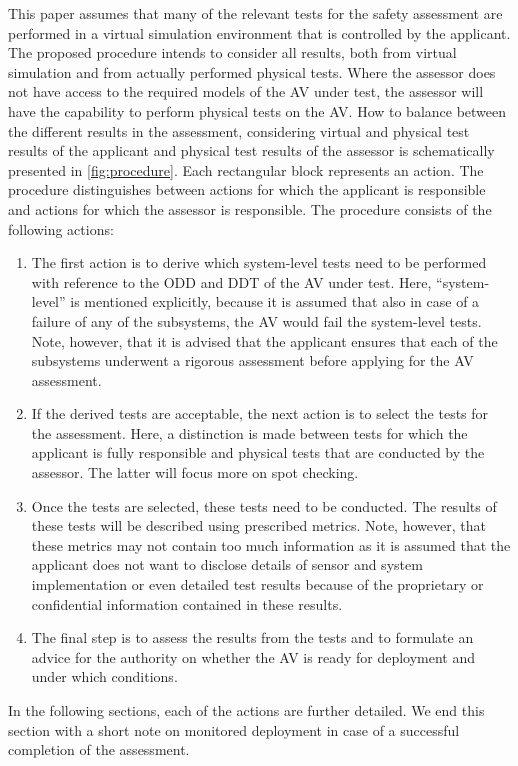 \documentclass[twoside,twocolumn,9pt]{article}
\theoremstyle{plain}
\theoremstyle{remark}\newtheorem{remarkenv}{Remark}        %
\begin{document}
This paper assumes that many of the relevant tests for the safety assessment are performed in a virtual simulation environment that is controlled by the applicant. The proposed procedure intends to consider all results, both from virtual simulation and from actually performed physical tests. Where the assessor does not have access to the required models of the AV under test, the assessor will have the capability to perform physical tests on the AV. How to balance between the different results in the assessment, considering virtual and physical test results of the applicant and physical test results of the assessor is schematically presented in \cref{fig:procedure}. Each rectangular block represents an action. The procedure distinguishes between actions for which the applicant is responsible and actions for which the assessor is responsible. The procedure consists of the following actions:
\begin{enumerate}
	\item The first action is to derive which system-level tests need to be performed with reference to the ODD and DDT of the AV under test. Here, “system-level” is mentioned explicitly, because it is assumed that also in case of a failure of any of the subsystems, the AV would fail the system-level tests. Note, however, that it is advised that the applicant ensures that each of the subsystems underwent a rigorous assessment before applying for the AV assessment. 
	\item If the derived tests are acceptable, the next action is to select the tests for the assessment. Here, a distinction is made between tests for which the applicant is fully responsible and physical tests that are conducted by the assessor. The latter will focus more on spot checking.
	\item Once the tests are selected, these tests need to be conducted. The results of these tests will be described using prescribed metrics. Note, however, that these metrics may not contain too much information as it is assumed that the applicant does not want to disclose details of sensor and system implementation or even detailed test results because of the proprietary or confidential information contained in these results. 
	\item The final step is to assess the results from the tests and to formulate an advice for the authority on whether the AV is ready for deployment and under which conditions.
\end{enumerate}

In the following sections, each of the actions are further detailed. We end this section with a short note on monitored deployment in case of a successful completion of the assessment.
\end{document}

